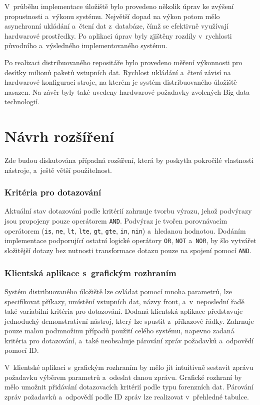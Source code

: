 V~průběhu implementace úložiště bylo provedeno několik úprav ke zvýšení propustnosti a~výkonu systému. Největší dopad na výkon potom mělo asynchronní ukládání a~čtení dat z~databáze, čímž se efektivně využívají hardwarové prostředky. Po aplikaci úprav byly zjištěny rozdíly v~rychlosti původního a~výsledného implementovaného systému.

Po realizaci distribuovaného repositáře bylo provedeno měření výkonnosti pro desítky milionů paketů vstupních dat. Rychlost ukládání a~čtení závisí na hardwarové konfiguraci stroje, na kterém je systém distribuovaného úložiště nasazen. Na závěr byly také uvedeny hardwarové požadavky zvolených Big data technologií.

\section{Návrh rozšíření}
Zde budou diskutována případná rozšíření, která by poskytla pokročilé vlastnosti nástroje, a~ještě větší použitelnost.

\subsubsection{Kritéria pro dotazování}
Aktuální stav dotazování podle kritérií zahrnuje tvorbu výrazu, jehož podvýrazy jsou propojeny pouze operátorem \texttt{AND}. Podvýraz je tvořen porovnávacím operátorem (\texttt{is}, \texttt{ne}, \texttt{lt}, \texttt{lte}, \texttt{gt}, \texttt{gte}, \texttt{in}, \texttt{nin}) a~hledanou hodnotou. Dodáním implementace podporující ostatní logické operátory \texttt{OR}, \texttt{NOT} a~\texttt{NOR}, by šlo vytvářet složitější dotazy bez nutnosti transformace dotazu pouze na spojení pomocí \texttt{AND}.

\subsubsection{Klientská aplikace s~grafickým rozhraním}
Systém distribuovaného úložiště lze ovládat pomocí mnoha parametrů, lze specifikovat příkazy, umístění vstupních dat, názvy front, a~v~neposlední řadě také variabilní kritéria pro dotazování. Dodaná klientská aplikace představuje jednoduchý demonstrativní nástroj, který lze spustit z~příkazové řádky. Zahrnuje pouze malou podmnožinu případů použití celého systému, napevno zadaná kritéria pro dotazování, a~také neobsahuje párování zpráv požadavků a~odpovědí pomocí ID.

V~klientské aplikaci s~grafickým rozhraním by mělo jít intuitivně sestavit zprávu požadavku výběrem parametrů a~odeslat danou zprávu. Grafické rozhraní by mělo umožnit přidávání dotazovacích kritérií podle typu forenzních dat. Párování zpráv požadavků a~odpovědí podle ID zpráv lze realizovat v~přehledné tabulce.


